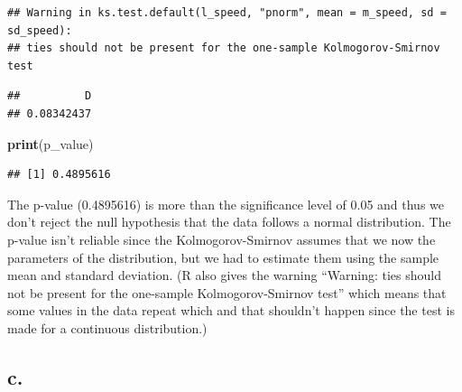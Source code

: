 \documentclass[
]{article}
\newenvironment{Shaded}{\begin{snugshade}}{\end{snugshade}}
\newcommand{\CommentTok}[1]{\textcolor[rgb]{0.56,0.35,0.01}{\textit{#1}}}
\newcommand{\FunctionTok}[1]{\textcolor[rgb]{0.13,0.29,0.53}{\textbf{#1}}}
\newcommand{\NormalTok}[1]{#1}
\newcommand{\OtherTok}[1]{\textcolor[rgb]{0.56,0.35,0.01}{#1}}
\newcommand{\SpecialCharTok}[1]{\textcolor[rgb]{0.81,0.36,0.00}{\textbf{#1}}}
\begin{document}
\begin{verbatim}
## Warning in ks.test.default(l_speed, "pnorm", mean = m_speed, sd = sd_speed):
## ties should not be present for the one-sample Kolmogorov-Smirnov test
\end{verbatim}

\begin{Shaded}
\end{Shaded}

\begin{verbatim}
##          D 
## 0.08342437
\end{verbatim}

\begin{Shaded}
\begin{Highlighting}[]
\FunctionTok{print}\NormalTok{(p\_value)}
\end{Highlighting}
\end{Shaded}

\begin{verbatim}
## [1] 0.4895616
\end{verbatim}

The p-value (0.4895616) is more than the significance level of 0.05 and
thus we don't reject the null hypothesis that the data follows a normal
distribution. The p-value isn't reliable since the Kolmogorov-Smirnov
assumes that we now the parameters of the distribution, but we had to
estimate them using the sample mean and standard deviation. (R also
gives the warning ``Warning: ties should not be present for the
one-sample Kolmogorov-Smirnov test'' which means that some values in the
data repeat which and that shouldn't happen since the test is made for a
continuous distribution.)

\subsection{c.}\label{c.-1}
\end{document}
